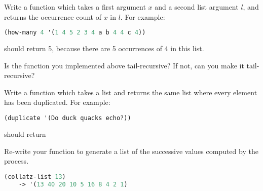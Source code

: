 \documentclass{../../../tp}
\begin{document}
\begin{instruction}	
	Write a function  which takes a first argument $x$ and a second list argument $l$, and returns the occurrence count of $x$ in $l$. For example:
	
	\begin{lstlisting}[language=lisp]
	(how-many 4 '(1 4 5 2 3 4 a b 4 4 c 4))
	\end{lstlisting}
	
	should return 5, because there are 5 occurrences of 4 in this list.
\end{instruction}

\begin{instruction}	
	Is the  function you implemented above tail-recursive? If not, can you make it tail-recursive?
\end{instruction}

\begin{instruction}	
	Write a function  which takes a list and returns the same list where every element has been duplicated. For example:
	
	\begin{lstlisting}[language=lisp]
	(duplicate '(Do duck quacks echo?))
	\end{lstlisting}
	
	should return 
\end{instruction}


\begin{instruction}	
	Re-write your  function to generate a list of the successive values computed by the process. 
	
	\begin{lstlisting}[language=lisp]
	(collatz-list 13)
	-> '(13 40 20 10 5 16 8 4 2 1)
	\end{lstlisting}
\end{instruction}
\end{document}
